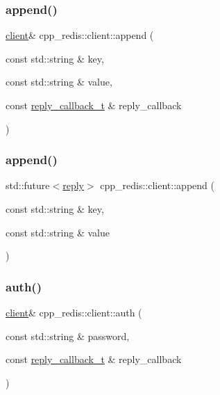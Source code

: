 \subsubsection{\texorpdfstring{append()}{append()}\hspace{0.1cm}{\footnotesize\ttfamily [1/2]}}
{\footnotesize\ttfamily \hyperlink{classcpp__redis_1_1client}{client}\& cpp\+\_\+redis\+::client\+::append (\begin{DoxyParamCaption}\item[{const std\+::string \&}]{key,  }\item[{const std\+::string \&}]{value,  }\item[{const \hyperlink{classcpp__redis_1_1client_a061a1140d36d2eaeda82b09a0bb3f9f2}{reply\+\_\+callback\+\_\+t} \&}]{reply\+\_\+callback }\end{DoxyParamCaption})}

\mbox{\label{classcpp__redis_1_1client_a3e50dddad0b4c9eca58d970bdc4e78da}} 
\subsubsection{\texorpdfstring{append()}{append()}\hspace{0.1cm}{\footnotesize\ttfamily [2/2]}}
{\footnotesize\ttfamily std\+::future$<$\hyperlink{classcpp__redis_1_1reply}{reply}$>$ cpp\+\_\+redis\+::client\+::append (\begin{DoxyParamCaption}\item[{const std\+::string \&}]{key,  }\item[{const std\+::string \&}]{value }\end{DoxyParamCaption})}

\mbox{\label{classcpp__redis_1_1client_a3ee834ca9c0810d2eafcf04de9dc0670}} 
\subsubsection{\texorpdfstring{auth()}{auth()}\hspace{0.1cm}{\footnotesize\ttfamily [1/2]}}
{\footnotesize\ttfamily \hyperlink{classcpp__redis_1_1client}{client}\& cpp\+\_\+redis\+::client\+::auth (\begin{DoxyParamCaption}\item[{const std\+::string \&}]{password,  }\item[{const \hyperlink{classcpp__redis_1_1client_a061a1140d36d2eaeda82b09a0bb3f9f2}{reply\+\_\+callback\+\_\+t} \&}]{reply\+\_\+callback }\end{DoxyParamCaption})}

